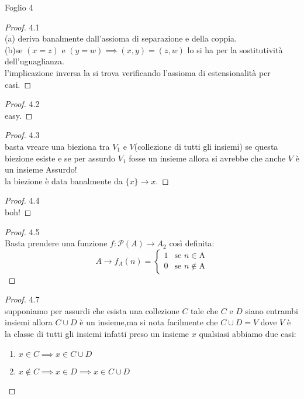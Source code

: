Foglio 4
\begin{proof}
4.1\\
(a) deriva banalmente dall'assioma di separazione e della coppia.\\
(b)se $(x=z)$ e $(y=w)\implies(x,y)=(z,w)$ lo si ha per la sostitutività dell'uguaglianza.\\
l'implicazione inversa la si trova verificando l'assioma di estensionalità per casi.
\end{proof}
\begin{proof}
4.2\\
easy.
\end{proof}
\begin{proof}
4.3\\
basta vreare una bieziona tra $V_1$ e $V$(collezione di tutti gli insiemi) se questa biezione esiste e se per assurdo $V_1$ fosse un insieme allora si avrebbe che anche $V$ è un insieme Assurdo!\\
la biezione è data banalmente da \(\lbrace x \rbrace\to x\).
\end{proof}
\begin{proof}
4.4\\
boh!
\end{proof}
\begin{proof}
4.5\\
Basta prendere una funzione $f:\mathcal{P}(A)\to{A}_2$ così definita:
$$A\to f_A(n) = \begin{cases} 1 & \mbox{se } n\in \mbox{A} \\ 0 & \mbox{se } n\not\in\mbox{A} \end{cases}$$
\end{proof}
\begin{proof}
4.7\\
supponiamo per assurdi che esista una collezione $C$ tale che $C$ e $D$ siano entrambi insiemi allora $C\cup D$ è un insieme,ma si nota facilmente che $C\cup D=V$ dove $V$ è la classe di tutti gli insiemi infatti preso un insieme $x$ qualsiasi abbiamo due casi:
\begin{enumerate}
\item $x\in C\implies x\in C\cup D$
\item $x\not\in C\implies x\in D\implies x\in C\cup D$
\end{enumerate}
\end{proof}
